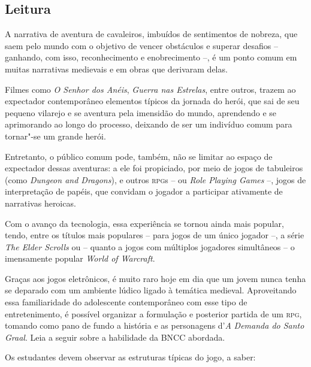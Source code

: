 \documentclass[11pt]{extarticle}
\begin{document}
\subsection{Leitura}



A narrativa de aventura de cavaleiros, imbuídos de
sentimentos de nobreza, que saem pelo mundo com o objetivo de vencer
obstáculos e superar desafios -- ganhando, com isso, reconhecimento e
enobrecimento --, é um ponto comum em muitas narrativas medievais e em
obras que derivaram delas.

Filmes como \emph{O Senhor dos Anéis}, \emph{Guerra nas Estrelas}, entre
outros, trazem ao expectador contemporâneo elementos típicos da jornada
do herói, que sai de seu pequeno vilarejo e se aventura pela imensidão
do mundo, aprendendo e se aprimorando ao longo do processo, deixando de
ser um indivíduo comum para tornar"-se um grande herói.

Entretanto, o público comum pode, também, não se limitar ao espaço de
expectador dessas aventuras: a ele foi propiciado, por meio de jogos de
tabuleiros (como \emph{Dungeon and Dragons}), e outros \textsc{rpg}s -- ou
\emph{Role Playing Games} --, jogos de interpretação de papéis, que
convidam o jogador a participar ativamente de narrativas heroicas.

Com o avanço da tecnologia, essa experiência se tornou ainda mais
popular, tendo, entre os títulos mais populares -- para jogos de um
único jogador --, a série \emph{The Elder Scrolls} ou -- quanto a jogos
com múltiplos jogadores simultâneos -- o imensamente popular \emph{World
of Warcraft}.

Graças aos jogos eletrônicos, é muito raro hoje em dia que um jovem
nunca tenha se deparado com um ambiente lúdico ligado à temática medieval.
Aproveitando essa familiaridade do adolescente contemporâneo com esse
tipo de entretenimento, é possível organizar a formulação e posterior
partida de um \textsc{rpg}, tomando como pano de fundo a história e as
personagens d'\emph{A} \emph{Demanda do Santo Graal}. Leia a seguir sobre a habilidade da BNCC abordada. 

Os estudantes devem observar as estruturas típicas do jogo, a saber:
\end{document}
